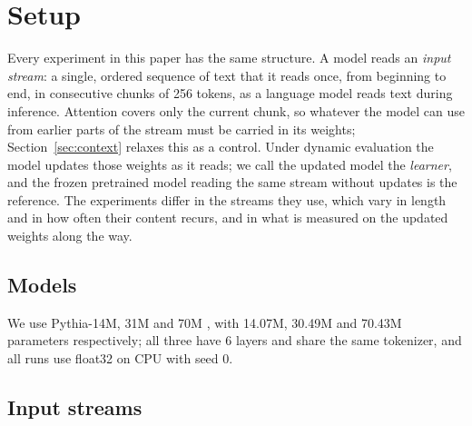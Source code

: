 \documentclass[10pt]{article}
\begin{document}
\section{Setup}\label{sec:setup}

Every experiment in this paper has the same structure.
A model reads an \emph{input stream}: a single, ordered sequence of text that it reads once, from beginning to end, in consecutive chunks of 256 tokens, as a language model reads text during inference.
Attention covers only the current chunk, so whatever the model can use from earlier parts of the stream must be carried in its weights; Section~\ref{sec:context} relaxes this as a control.
Under dynamic evaluation the model updates those weights as it reads; we call the updated model the \emph{learner}, and the frozen pretrained model reading the same stream without updates is the reference.
The experiments differ in the streams they use, which vary in length and in how often their content recurs, and in what is measured on the updated weights along the way.

\subsection{Models}

We use Pythia-14M, 31M and 70M \cite{biderman2023pythia}, with 14.07M, 30.49M and 70.43M parameters respectively; all three have 6 layers and share the same tokenizer, and all runs use float32 on CPU with seed 0.



\subsection{Input streams}
\end{document}
